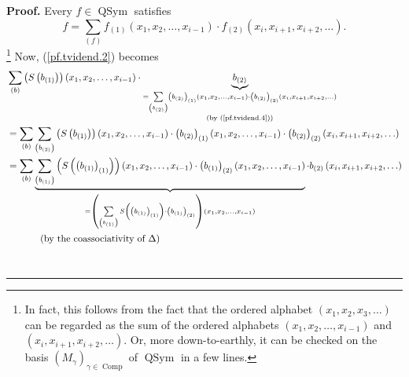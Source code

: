 \documentclass
[numbers=enddot,12pt,final,onecolumn,notitlepage,abstracton]{scrartcl}%
\theoremstyle{definition}
\newenvironment{proof}[1][Proof]{\noindent\textbf{#1.} }{\ \rule{0.5em}{0.5em}}
\newenvironment{verlong}{}{}
\newenvironment{noncompile}{}{}
\let\sumnonlimits\sum
\renewcommand{\sum}{\sumnonlimits\limits}
\begin{document}
\begin{verlong}
\begin{noncompile}
\begin{proof}
Every $f\in\operatorname*{QSym}$ satisfies%
\begin{equation}
f=\sum_{\left(  f\right)  }f_{\left(  1\right)  }\left(  x_{1},x_{2}%
,\ldots,x_{i-1}\right)  \cdot f_{\left(  2\right)  }\left(  x_{i}%
,x_{i+1},x_{i+2},\ldots\right)  . \label{pf.tvidend.4}%
\end{equation}
\footnote{In fact, this follows from the fact that the ordered alphabet
$\left(  x_{1},x_{2},x_{3},\ldots\right)  $ can be regarded as the sum of the
ordered alphabets $\left(  x_{1},x_{2},\ldots,x_{i-1}\right)  $ and $\left(
x_{i},x_{i+1},x_{i+2},\ldots\right)  $. Or, more down-to-earthly, it can be
checked on the basis $\left(  M_{\gamma}\right)  _{\gamma\in
\operatorname*{Comp}}$ of $\operatorname*{QSym}$ in a few lines.} Now,
(\ref{pf.tvidend.2}) becomes%
\begin{align*}
&  \sum_{\left(  b\right)  }\left(  S\left(  b_{\left(  1\right)  }\right)
\right)  \left(  x_{1},x_{2},\ldots,x_{i-1}\right)  \cdot
\underbrace{b_{\left(  2\right)  }}_{\substack{=\sum_{\left(  b_{\left(
2\right)  }\right)  }\left(  b_{\left(  2\right)  }\right)  _{\left(
1\right)  }\left(  x_{1},x_{2},\ldots,x_{i-1}\right)  \cdot\left(  b_{\left(
2\right)  }\right)  _{\left(  2\right)  }\left(  x_{i},x_{i+1},x_{i+2}%
,\ldots\right)  \\\text{(by (\ref{pf.tvidend.4}))}}}\\
&  =\sum_{\left(  b\right)  }\sum_{\left(  b_{\left(  2\right)  }\right)
}\left(  S\left(  b_{\left(  1\right)  }\right)  \right)  \left(  x_{1}%
,x_{2},\ldots,x_{i-1}\right)  \cdot\left(  b_{\left(  2\right)  }\right)
_{\left(  1\right)  }\left(  x_{1},x_{2},\ldots,x_{i-1}\right)  \cdot\left(
b_{\left(  2\right)  }\right)  _{\left(  2\right)  }\left(  x_{i}%
,x_{i+1},x_{i+2},\ldots\right) \\
&  =\sum_{\left(  b\right)  }\underbrace{\sum_{\left(  b_{\left(  1\right)
}\right)  }\left(  S\left(  \left(  b_{\left(  1\right)  }\right)  _{\left(
1\right)  }\right)  \right)  \left(  x_{1},x_{2},\ldots,x_{i-1}\right)
\cdot\left(  b_{\left(  1\right)  }\right)  _{\left(  2\right)  }\left(
x_{1},x_{2},\ldots,x_{i-1}\right)  }_{=\left(  \sum_{\left(  b_{\left(
1\right)  }\right)  }S\left(  \left(  b_{\left(  1\right)  }\right)  _{\left(
1\right)  }\right)  \cdot\left(  b_{\left(  1\right)  }\right)  _{\left(
2\right)  }\right)  \left(  x_{1},x_{2},\ldots,x_{i-1}\right)  }\cdot
b_{\left(  2\right)  }\left(  x_{i},x_{i+1},x_{i+2},\ldots\right) \\
&  \ \ \ \ \ \ \ \ \ \ \left(  \text{by the coassociativity of }\Delta\right)

\end{align*}
\end{proof}
\end{noncompile}
\end{verlong}
\end{document}
